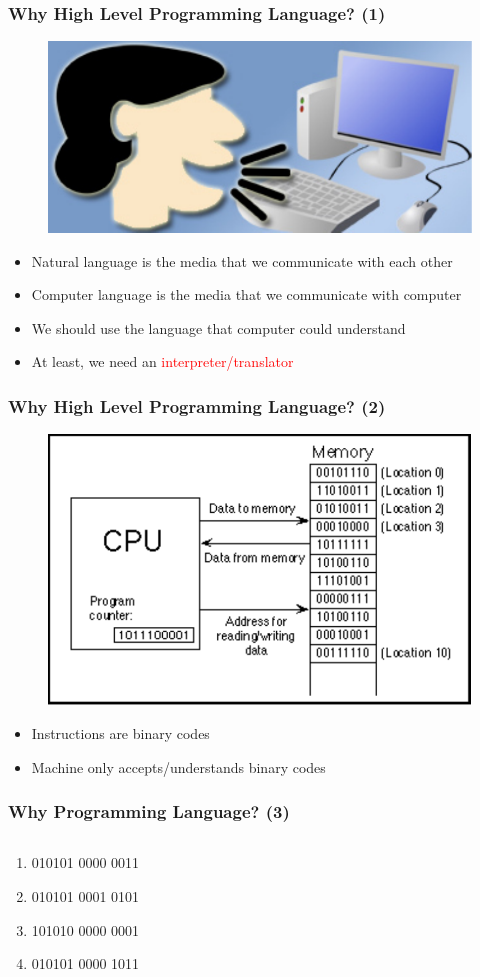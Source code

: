 \begin{frame}
	\frametitle{Why High Level Programming Language? (1)}
\begin{figure}
	\includegraphics[width=0.75\linewidth]{figs/talk2pc.pdf}
\end{figure}
\begin{itemize}
	\item {Natural language is the media that we communicate with each other}
	\item {Computer language is the media that we communicate with computer}
	\item {We should use the language that computer could understand}
	\item {At least, we need an \textcolor{red}{interpreter/translator}}
\end{itemize}
\end{frame}

\begin{frame}
	\frametitle{Why High Level Programming Language? (2)}
	\begin{figure}
	\includegraphics[width=0.65\linewidth]{figs/workflow.pdf}
\end{figure}
\begin{itemize}
	\item {Instructions are binary codes}
	\item {Machine only accepts/understands binary codes}
\end{itemize}
\end{frame}

\begin{frame}
	\frametitle{Why Programming Language? (3)}
\begin{columns}
\begin{column}{0.45\linewidth}
\begin{enumerate}
	\item {010101 0000 0011}
	\item {010101 0001 0101}
	\item {101010 0000 0001}
	\item {010101 0000 1011}
\end{enumerate}
\end{column}
\end{columns}
\end{frame}

